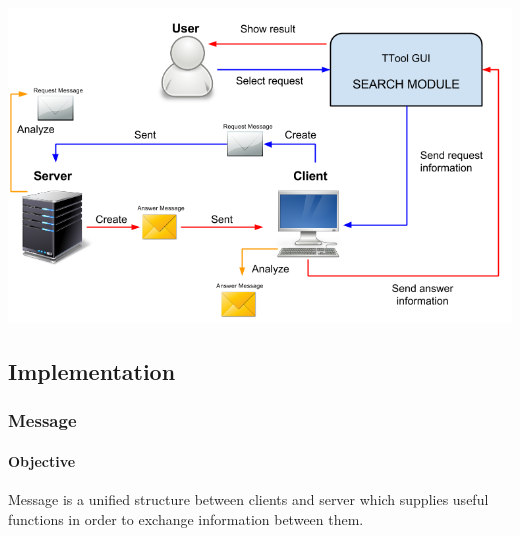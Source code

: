 \documentclass[a4paper,12pt,oneside]{report}
\begin{document}
\begin {itemize}
	\begin{center}
	\includegraphics[scale=0.5]{Protocol5.png}\par
	\end{center}
			
	\end {itemize}
	
	\subsection{Implementation}
		\subsubsection{Message}
			\paragraph{Objective} Message is a unified structure between clients and server which supplies useful functions in order to exchange information between them.
\end{document}
